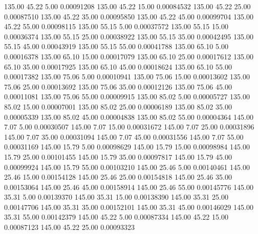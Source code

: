     135.00     45.22      5.00     0.00091208
    135.00     45.22     15.00     0.00084532
    135.00     45.22     25.00     0.00087510
    135.00     45.22     35.00     0.00095850
    135.00     45.22     45.00     0.00099704
    135.00     45.22     55.00     0.00098115
    135.00     55.15      5.00     0.00037572
    135.00     55.15     15.00     0.00036374
    135.00     55.15     25.00     0.00038922
    135.00     55.15     35.00     0.00042495
    135.00     55.15     45.00     0.00043919
    135.00     55.15     55.00     0.00041788
    135.00     65.10      5.00     0.00016378
    135.00     65.10     15.00     0.00017079
    135.00     65.10     25.00     0.00017612
    135.00     65.10     35.00     0.00017925
    135.00     65.10     45.00     0.00018624
    135.00     65.10     55.00     0.00017382
    135.00     75.06      5.00     0.00010941
    135.00     75.06     15.00     0.00013602
    135.00     75.06     25.00     0.00013692
    135.00     75.06     35.00     0.00012126
    135.00     75.06     45.00     0.00011081
    135.00     75.06     55.00     0.00009915
    135.00     85.02      5.00     0.00005727
    135.00     85.02     15.00     0.00007001
    135.00     85.02     25.00     0.00006189
    135.00     85.02     35.00     0.00005339
    135.00     85.02     45.00     0.00004838
    135.00     85.02     55.00     0.00004364
    145.00      7.07      5.00     0.00030507
    145.00      7.07     15.00     0.00031672
    145.00      7.07     25.00     0.00031896
    145.00      7.07     35.00     0.00031094
    145.00      7.07     45.00     0.00031556
    145.00      7.07     55.00     0.00031169
    145.00     15.79      5.00     0.00098629
    145.00     15.79     15.00     0.00098984
    145.00     15.79     25.00     0.00101455
    145.00     15.79     35.00     0.00097817
    145.00     15.79     45.00     0.00099924
    145.00     15.79     55.00     0.00103210
    145.00     25.46      5.00     0.00140461
    145.00     25.46     15.00     0.00154128
    145.00     25.46     25.00     0.00154818
    145.00     25.46     35.00     0.00153064
    145.00     25.46     45.00     0.00158914
    145.00     25.46     55.00     0.00145776
    145.00     35.31      5.00     0.00139370
    145.00     35.31     15.00     0.00138390
    145.00     35.31     25.00     0.00147706
    145.00     35.31     35.00     0.00152101
    145.00     35.31     45.00     0.00146029
    145.00     35.31     55.00     0.00142379
    145.00     45.22      5.00     0.00087334
    145.00     45.22     15.00     0.00087123
    145.00     45.22     25.00     0.00093323
